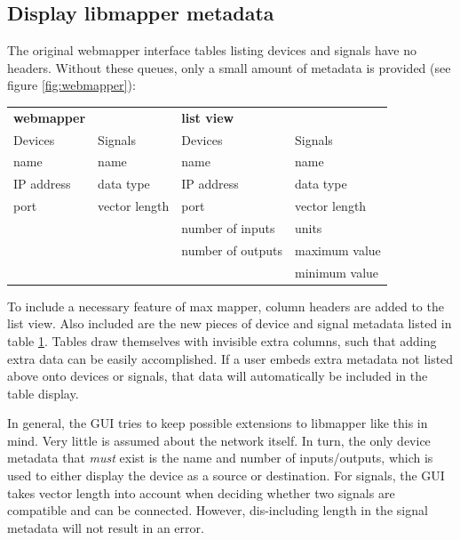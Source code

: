 	
	\subsection{Display libmapper metadata} %
	\label{sub:display_libmapper_metadata}

The original webmapper interface tables listing devices and signals have no headers. Without these queues, only a small amount of metadata is provided (see figure \ref{fig:webmapper}):

\begin{table}
	\centering
	\label{tab:webmapper_list_view_metadata}
		\begin{tabular}{l  l  |  l l }
		\hline\hline
		\textbf{webmapper}&&\textbf{list view}\\
		Devices&Signals&Devices&Signals\\
		\hline
		name&name&name&name\\
		IP address&data type&IP address&data type\\
		port&vector length&port&vector length\\
		&&number of inputs&units\\
		&&number of outputs&maximum value\\
		&&&minimum value\\
		\end{tabular}
\end{table}

To include a necessary feature of max mapper, column headers are added to the list view. Also included are the new pieces of device and signal metadata listed in table \ref{tab:webmapper_list_view_metadata}. Tables draw themselves with invisible extra columns, such that adding extra data can be easily accomplished. If a user embeds extra metadata not listed above onto devices or signals, that data will automatically be included in the table display.  

In general, the GUI tries to keep possible extensions to libmapper like this in mind. Very little is assumed about the network itself. In turn, the only device metadata that \emph{must} exist is the name and number of inputs/outputs, which is used to either display the device as a source or destination. For signals, the GUI takes vector length into account when deciding whether two signals are compatible and can be connected. However, dis-including length in the signal metadata will not result in an error.
	

